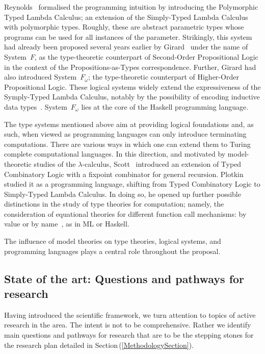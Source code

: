 \documentclass[11pt,twocolumn]{article}
\newcommand{\pref}[1]{\,(\ref{#1})}
\newcommand{\lcalculus}{\mbox{$\lambda$-calculus}}
\newcommand{\SystemF}{\mbox{System~$F$}}
\newcommand{\SystemFomega}{\mbox{System~$F_\omega$}}
\begin{document}
Reynolds~\cite{Reynolds} formalised the programming intuition by introducing
the Polymorphic Typed Lambda Calculus; an extension of the Simply-Typed Lambda
Calculus with polymorphic types.  Roughly, these are abstract parametric types
whose programs can be used for all instances of the parameter.  Strikingly,
this system had already been proposed several years earlier by
Girard~\cite{GirardSystemF} under the name of {\SystemF}, as the
type-theoretic counterpart of Second-Order Propositional Logic in the
context of the Propositions-as-Types correspondence.  Further, Girard had
also introduced {\SystemFomega}; the type-theoretic counterpart of
Higher-Order Propositional Logic.  These logical systems widely extend the
expressiveness of the Symply-Typed Lambda Calculus, notably by the
possibility of encoding inductive data types~\cite{BoehmBerarducci}.
{\SystemFomega} lies at the core of the Haskell programming
language. %

The type systems mentioned above aim at providing logical foundations and, as
such, when viewed as programming languages can only introduce terminating
computations.  There are various ways in which one can extend them to Turing
complete computational languages.  In this direction, and motivated by
model-theoretic studies of the \lcalculus, Scott~\cite{ScottTCS}
introduced an extension of Typed Combinatory Logic with a fixpoint
combinator for general recursion.  Plotkin~\cite{PlotkinLCF} studied it as a
programming language, shifting from Typed Combinatory Logic to Simply-Typed
Lambda Calculus.  In doing so, he opened up further possible distinctions in
the study of type theories for computation; namely, the consideration of
equational theories for different function call mechanisms: by value or by
name~\cite{PlotkinCBVCBN}, as in ML or Haskell.  

The influence of model theories on type theories, logical systems, and
programming languages %
plays a central role throughout the proposal.

\subsection{State of the art: Questions and pathways for research}
\label{StateOfTheArtSubsection}

Having introduced the scientific framework, we turn attention to topics of
active research in the area.  The intent is not to be comprehensive.
Rather we identify main questions and pathways for research that are to be
the stepping stones for the research plan detailed in
Section\pref{MethodologySection}.
\end{document}
